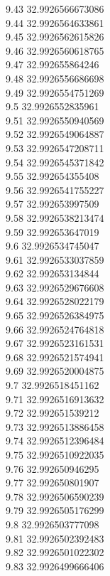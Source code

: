 {9.43	32.9926566673086\\
9.44	32.9926564633861\\
9.45	32.9926562615826\\
9.46	32.9926560618765\\
9.47	32.992655864246\\
9.48	32.9926556686698\\
9.49	32.9926554751269\\
9.5	32.9926552835961\\
9.51	32.9926550940569\\
9.52	32.9926549064887\\
9.53	32.9926547208711\\
9.54	32.9926545371842\\
9.55	32.992654355408\\
9.56	32.9926541755227\\
9.57	32.992653997509\\
9.58	32.9926538213474\\
9.59	32.992653647019\\
9.6	32.9926534745047\\
9.61	32.9926533037859\\
9.62	32.992653134844\\
9.63	32.9926529676608\\
9.64	32.9926528022179\\
9.65	32.9926526384975\\
9.66	32.9926524764818\\
9.67	32.9926523161531\\
9.68	32.9926521574941\\
9.69	32.9926520004875\\
9.7	32.9926518451162\\
9.71	32.9926516913632\\
9.72	32.992651539212\\
9.73	32.9926513886458\\
9.74	32.9926512396484\\
9.75	32.9926510922035\\
9.76	32.992650946295\\
9.77	32.992650801907\\
9.78	32.9926506590239\\
9.79	32.9926505176299\\
9.8	32.9926503777098\\
9.81	32.9926502392483\\
9.82	32.9926501022302\\
9.83	32.9926499666406\\
}
